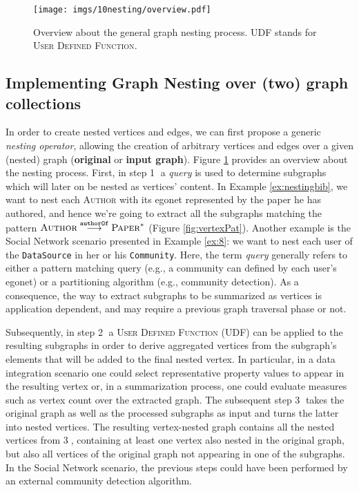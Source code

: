 \begin{figure}[!t]
	\centering
	\texttt{[image: imgs/10nesting/overview.pdf]}
	\caption{Overview about the general graph nesting process. UDF stands for \textsc{User Defined Function}.}
	\label{fig:process}
\end{figure}
\subsection{Implementing Graph Nesting over (two) graph collections}\label{subsec:polyovergraph}
In order to create nested vertices and edges, we can first propose a generic \textit{nesting operator}, allowing the creation of arbitrary vertices and edges over a given (nested) graph (\textbf{original} or \textbf{input graph}). Figure \ref{fig:process} provides an overview about the nesting process. First, in step \textcircled{\raisebox{-.5pt}1} a \textit{query} is used to determine subgraphs which will later on be nested as vertices' content. In Example \vref{ex:nestingbib}, we want to nest each \textsc{Author} with its egonet represented by the paper he has authored, and hence we're going to extract all the subgraphs matching the pattern $\textsc{Author}\overset{\texttt{authorOf}}{\longrightarrow}\textsc{Paper}^*$ (Figure \ref{fig:vertexPat}). Another example is the Social Network scenario presented in Example \vref{ex:8}: we want to nest each user of the \texttt{DataSource} in her or his \texttt{Community}. Here, the term \textit{query} generally refers to either a pattern matching query (e.g., a community can defined by each user's egonet) or a partitioning algorithm (e.g., community detection). As a consequence, the way to extract subgraphs to be summarized as vertices is application dependent, and may require a previous graph traversal phase or not.


%
Subsequently, in step \textcircled{\raisebox{-.5pt}2} a \textsc{User Defined Function} (UDF) can be applied to the resulting subgraphs in order to derive aggregated vertices from the subgraph's elements that will be added to the final nested vertex. In particular, in a data integration scenario one could select representative property values to appear in the resulting vertex or, in a summarization process, one could evaluate measures such as vertex count over the extracted graph. The subsequent step \textcircled{\raisebox{-.5pt}3} takes the original graph as well as the processed subgraphs as input and turns the latter into nested vertices. The resulting vertex-nested graph contains all the nested vertices from \textcircled{\raisebox{-.5pt}3}, containing at least one vertex also nested in the original graph, but also all vertices of the original graph not appearing in one of the subgraphs. In the Social Network scenario, the previous steps could have been performed by an external community detection algorithm. 

